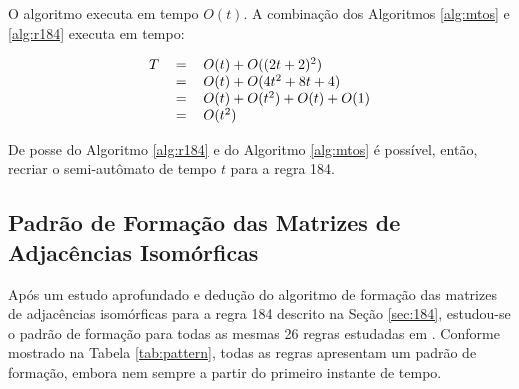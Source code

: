 \documentclass[12pt,a4paper]{article}
\begin{document}
O algoritmo executa em tempo $O(t)$. A combinação dos Algoritmos
\ref{alg:mtos} e \ref{alg:r184} executa em tempo:

\begin{equation}
\begin{tabular}{ r c l }
\(T\) & \(=\) & \(O(t) + O((2t+2)^2)\) \\
  & \(=\) & \(O(t) + O(4t^2+8t+4)\) \\
  & \(=\) & \(O(t) + O(t^2) + O(t) + O(1)\) \\
  & \(=\) & \(O(t^2)\)
\end{tabular}
\end{equation}

De posse do Algoritmo \ref{alg:r184} e do Algoritmo \ref{alg:mtos} é
possível, então, recriar o semi-autômato de tempo $t$ para a regra 184.

\subsection{Padrão de Formação das Matrizes de Adjacências Isomórficas}\label{sec:pattern}

Após um estudo aprofundado e dedução do algoritmo de formação das matrizes
de adjacências isomórficas para a regra 184 descrito na Seção \ref{sec:184},
estudou-se o padrão de formação para todas as mesmas 26 regras estudadas em
. Conforme mostrado na Tabela \ref{tab:pattern},
todas as regras apresentam um padrão de formação, embora nem sempre a
partir do primeiro instante de tempo.
\end{document}
